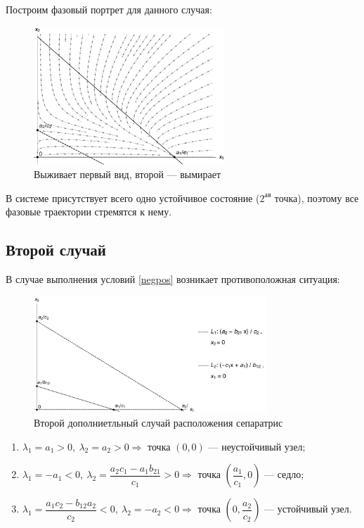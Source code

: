 \documentclass[12pt,a4paper]{article}
\begin{document}
    \pagebreak

    Построим фазовый портрет для данного случая:
    \begin{figure}[h]
        \centering
        \includegraphics[width=0.64\textwidth]{phase_3.pdf}
        \caption{Выживает первый вид, второй --- вымирает}
        \label{fig:phase_3}
    \end{figure}
    
    В системе присутствует всего одно устойчивое состояние ($2^{\text{ая}}$ точка), поэтому все фазовые траектории стремятся к нему.

    \subsection{Второй случай}
    В случае выполнения условий \eqref{negpos} возникает противоположная ситуация:
    \begin{figure}[h]
        \centering
        \includegraphics[width=0.78\textwidth]{sep_4.pdf}
        \caption{Второй дополниетльный случай расположения сепаратрис}
        \label{fig:sep_4}
    \end{figure}

    \begin{enumerate}
        \setlength\itemsep{0.5em}
        \item $ \lambda_1 = a_1 > 0,\ \lambda_2 = a_2 > 0 \Rightarrow $ точка $ (0, 0) $ --- неустойчивый узел;
    
        \item $ \lambda_1 = -a_1 < 0,\ \lambda_2 = \dfrac{a_2 c_1 - a_1 b_{21}}{c_1} > 0 \Rightarrow $ точка $ \left( \dfrac{a_1}{c_1}, 0 \right) $ --- седло;
        
        \item  $ \lambda_1 = \dfrac{a_1 c_2 - b_{12} a_2}{c_2} < 0,\ \lambda_2 = -a_2 < 0 \Rightarrow $ точка $ \left( 0, \dfrac{a_2}{c_2} \right) $ --- устойчивый узел.
    \end{enumerate}
\end{document}
